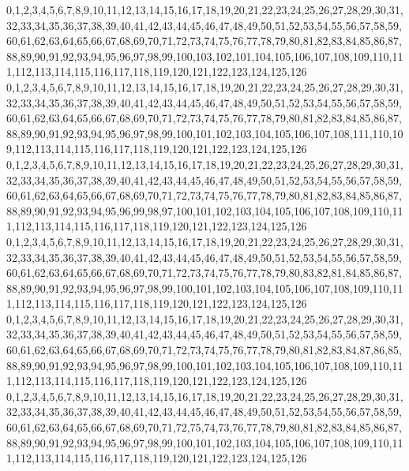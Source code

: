 \documentclass[12pt]{article}
\begin{document}
{0,1,2,3,4,5,6,7,8,9,10,11,12,13,14,15,16,17,18,19,20,21,22,23,24,25,26,27,28,29,30,31,32,33,34,35,36,37,38,39,40,41,42,43,44,45,46,47,48,49,50,51,52,53,54,55,56,57,58,59,60,61,62,63,64,65,66,67,68,69,70,71,72,73,74,75,76,77,78,79,80,81,82,83,84,85,86,87,88,89,90,91,92,93,94,95,96,97,98,99,100,103,102,101,104,105,106,107,108,109,110,111,112,113,114,115,116,117,118,119,120,121,122,123,124,125,126\\
0,1,2,3,4,5,6,7,8,9,10,11,12,13,14,15,16,17,18,19,20,21,22,23,24,25,26,27,28,29,30,31,32,33,34,35,36,37,38,39,40,41,42,43,44,45,46,47,48,49,50,51,52,53,54,55,56,57,58,59,60,61,62,63,64,65,66,67,68,69,70,71,72,73,74,75,76,77,78,79,80,81,82,83,84,85,86,87,88,89,90,91,92,93,94,95,96,97,98,99,100,101,102,103,104,105,106,107,108,111,110,109,112,113,114,115,116,117,118,119,120,121,122,123,124,125,126\\
0,1,2,3,4,5,6,7,8,9,10,11,12,13,14,15,16,17,18,19,20,21,22,23,24,25,26,27,28,29,30,31,32,33,34,35,36,37,38,39,40,41,42,43,44,45,46,47,48,49,50,51,52,53,54,55,56,57,58,59,60,61,62,63,64,65,66,67,68,69,70,71,72,73,74,75,76,77,78,79,80,81,82,83,84,85,86,87,88,89,90,91,92,93,94,95,96,99,98,97,100,101,102,103,104,105,106,107,108,109,110,111,112,113,114,115,116,117,118,119,120,121,122,123,124,125,126\\
0,1,2,3,4,5,6,7,8,9,10,11,12,13,14,15,16,17,18,19,20,21,22,23,24,25,26,27,28,29,30,31,32,33,34,35,36,37,38,39,40,41,42,43,44,45,46,47,48,49,50,51,52,53,54,55,56,57,58,59,60,61,62,63,64,65,66,67,68,69,70,71,72,73,74,75,76,77,78,79,80,83,82,81,84,85,86,87,88,89,90,91,92,93,94,95,96,97,98,99,100,101,102,103,104,105,106,107,108,109,110,111,112,113,114,115,116,117,118,119,120,121,122,123,124,125,126\\
0,1,2,3,4,5,6,7,8,9,10,11,12,13,14,15,16,17,18,19,20,21,22,23,24,25,26,27,28,29,30,31,32,33,34,35,36,37,38,39,40,41,42,43,44,45,46,47,48,49,50,51,52,53,54,55,56,57,58,59,60,61,62,63,64,65,66,67,68,69,70,71,72,73,74,75,76,77,78,79,80,81,82,83,84,87,86,85,88,89,90,91,92,93,94,95,96,97,98,99,100,101,102,103,104,105,106,107,108,109,110,111,112,113,114,115,116,117,118,119,120,121,122,123,124,125,126\\
0,1,2,3,4,5,6,7,8,9,10,11,12,13,14,15,16,17,18,19,20,21,22,23,24,25,26,27,28,29,30,31,32,33,34,35,36,37,38,39,40,41,42,43,44,45,46,47,48,49,50,51,52,53,54,55,56,57,58,59,60,61,62,63,64,65,66,67,68,69,70,71,72,75,74,73,76,77,78,79,80,81,82,83,84,85,86,87,88,89,90,91,92,93,94,95,96,97,98,99,100,101,102,103,104,105,106,107,108,109,110,111,112,113,114,115,116,117,118,119,120,121,122,123,124,125,126\\
}
\end{document}
